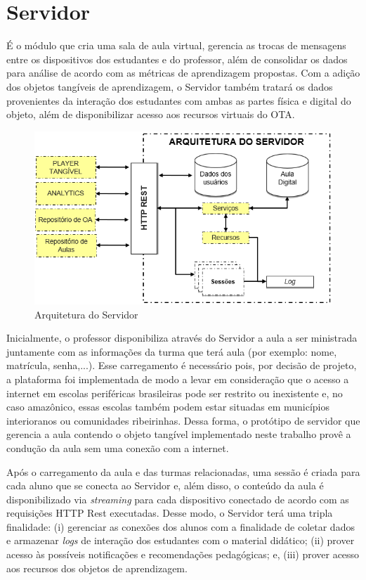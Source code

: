 \section{Servidor}\label{section:service}
É o módulo que cria uma sala de aula virtual, gerencia as trocas de mensagens entre os dispositivos dos estudantes e do professor, além de consolidar os dados para análise de acordo com as métricas de aprendizagem propostas. Com a adição dos objetos tangíveis de aprendizagem, o Servidor também tratará os dados provenientes da interação dos estudantes com ambas as partes física e digital do objeto, além de disponibilizar acesso aos recursos virtuais do OTA.


\begin{figure}[htbp]
	\centering
	\includegraphics[width=0.8\linewidth]{chapters/proposedMethod/arquitetura_servidor.png}
	\caption{Arquitetura do Servidor}
	\label{fig:servidor}
\end{figure}

Inicialmente, o professor disponibiliza através do Servidor a aula a ser ministrada juntamente com as informações da turma que terá aula (por exemplo: nome, matrícula, senha,...). Esse carregamento é necessário pois, por decisão de projeto, a plataforma foi implementada de modo a levar em consideração que o acesso a internet em escolas periféricas brasileiras pode ser restrito ou inexistente e, no caso amazônico, essas escolas também podem estar situadas em municípios interioranos ou comunidades ribeirinhas. Dessa forma, o protótipo de servidor que gerencia a aula contendo o objeto tangível implementado neste trabalho provê a condução da aula sem uma conexão com a internet.

Após o carregamento da aula e das turmas relacionadas, uma sessão é criada para cada aluno que se conecta ao Servidor e, além disso, o conteúdo da aula é disponibilizado via \textit{streaming} para cada dispositivo conectado de acordo com as requisições HTTP Rest executadas. Desse modo, o Servidor terá uma tripla finalidade: (i) gerenciar as conexões dos alunos com a finalidade de coletar dados e armazenar \textit{logs} de interação dos estudantes com o material didático; (ii) prover acesso às possíveis notificações e recomendações pedagógicas; e, (iii) prover acesso aos recursos dos objetos de aprendizagem.

